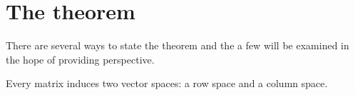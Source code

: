 \section{The theorem}

There are several ways to state the theorem and the a few will be examined in the hope of providing perspective.

Every matrix induces two vector spaces: a row space and a column space.

